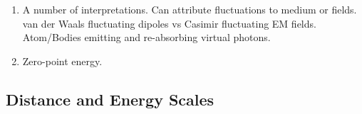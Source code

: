 \begin{enumerate}
  \item A number of interpretations.  Can attribute fluctuations to medium or fields.  
    van der Waals fluctuating dipoles vs Casimir fluctuating EM fields.  
    Atom/Bodies emitting and re-absorbing virtual photons.  
  \item Zero-point energy.  
\end{enumerate}

\subsection{Distance and Energy Scales}

